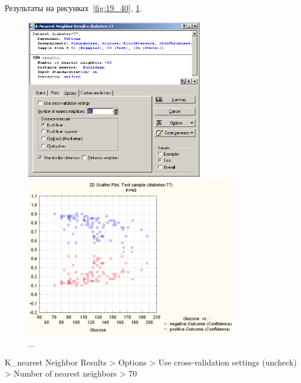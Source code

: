 Результаты на рисунках~\ref{fig:19_40}, \ref{fig:20_40}.

\begin{figure}[!h]
  \centering

  \begin{minipage}{0.49\textwidth}
    \centering

    \includegraphics[height=7cm]
    {inc/v5_24.PNG}

    \caption{\_}

    \label{fig:19_40}
  \end{minipage}
  \begin{minipage}{0.49\textwidth}
    \centering

    \includegraphics[height=7cm]
    {inc/v5_25.PNG}

    \caption{\_}

    \label{fig:20_40}
  \end{minipage}
\end{figure}

\newpage

K\_nearest Neighbor Results > Options > Use cross-validation settings (uncheck) \\
> Number of nearest neighbors > 70

